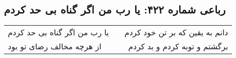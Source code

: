 \begin{center}
\section*{رباعی شماره ۴۲۲: یا رب من اگر گناه بی حد کردم}
\label{sec:sh422}
\begin{longtable}{l p{0.5cm} r}
یا رب من اگر گناه بی حد کردم
&&
دانم به یقین که بر تن خود کردم
\\
از هرچه مخالف رضای تو بود
&&
برگشتم و توبه کردم و بد کردم
\\
\end{longtable}
\end{center}
